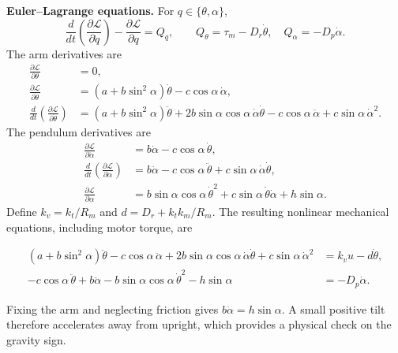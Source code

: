 \textbf{Euler--Lagrange equations.}
For $q\in\{\theta,\alpha\}$,
\begin{equation}
\frac{d}{dt}\left(\frac{\partial\mathcal L}{\partial\dot q}\right)
-\frac{\partial\mathcal L}{\partial q}=Q_q,\qquad
Q_\theta=\tau_m-D_r\dot\theta,\quad Q_\alpha=-D_p\dot\alpha.
\end{equation}
The arm derivatives are
\begin{align}
\frac{\partial\mathcal L}{\partial\theta}&=0,\\
\frac{\partial\mathcal L}{\partial\dot\theta}
&=(a+b\sin^2\alpha)\dot\theta-c\cos\alpha\,\dot\alpha,\\
\frac{d}{dt}\left(\frac{\partial\mathcal L}{\partial\dot\theta}\right)
&=(a+b\sin^2\alpha)\ddot\theta
+2b\sin\alpha\cos\alpha\,\dot\alpha\dot\theta
-c\cos\alpha\,\ddot\alpha+c\sin\alpha\,\dot\alpha^2.
\end{align}
The pendulum derivatives are
\begin{align}
\frac{\partial\mathcal L}{\partial\dot\alpha}
&=b\dot\alpha-c\cos\alpha\,\dot\theta,\\
\frac{d}{dt}\left(\frac{\partial\mathcal L}{\partial\dot\alpha}\right)
&=b\ddot\alpha-c\cos\alpha\,\ddot\theta
+c\sin\alpha\,\dot\alpha\dot\theta,\\
\frac{\partial\mathcal L}{\partial\alpha}
&=b\sin\alpha\cos\alpha\,\dot\theta^2
+c\sin\alpha\,\dot\theta\dot\alpha+h\sin\alpha.
\end{align}
Define $k_v=k_t/R_m$ and $d=D_r+k_tk_m/R_m$. The resulting
nonlinear mechanical equations, including motor torque, are
\begin{samepage}
\begin{subequations}\label{eq:eom}
\begin{align}
(a+b\sin^2\alpha)\ddot\theta-c\cos\alpha\,\ddot\alpha
+2b\sin\alpha\cos\alpha\,\dot\alpha\dot\theta
+c\sin\alpha\,\dot\alpha^2&=k_vu-d\dot\theta,\\
-c\cos\alpha\,\ddot\theta+b\ddot\alpha
-b\sin\alpha\cos\alpha\,\dot\theta^2-h\sin\alpha&=-D_p\dot\alpha.
\end{align}
\end{subequations}
\end{samepage}
Fixing the arm and neglecting friction gives $b\ddot\alpha=h\sin\alpha$.
A small positive tilt therefore accelerates away from upright, which
provides a physical check on the gravity sign.


